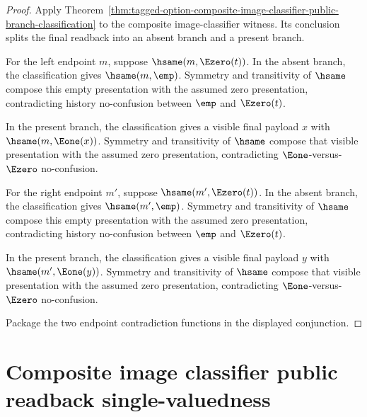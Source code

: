 \begin{proof}
Apply
Theorem~\ref{thm:tagged-option-composite-image-classifier-public-branch-classification}
to the composite image-classifier witness. Its conclusion splits the final
readback into an absent branch and a present branch.

For the left endpoint $m$, suppose $\hsame(m,\Ezero(t))$. In the absent branch,
the classification gives $\hsame(m,\emp)$. Symmetry and transitivity of
$\hsame$ compose this empty presentation with the assumed zero presentation,
contradicting history no-confusion between $\emp$ and $\Ezero(t)$.

In the present branch, the classification gives a visible final payload $x$
with $\hsame(m,\Eone(x))$. Symmetry and transitivity of $\hsame$ compose that
visible presentation with the assumed zero presentation, contradicting
$\Eone$-versus-$\Ezero$ no-confusion.

For the right endpoint $m'$, suppose $\hsame(m',\Ezero(t))$. In the absent
branch, the classification gives $\hsame(m',\emp)$. Symmetry and transitivity
of $\hsame$ compose this empty presentation with the assumed zero presentation,
contradicting history no-confusion between $\emp$ and $\Ezero(t)$.

In the present branch, the classification gives a visible final payload $y$
with $\hsame(m',\Eone(y))$. Symmetry and transitivity of $\hsame$ compose that
visible presentation with the assumed zero presentation, contradicting
$\Eone$-versus-$\Ezero$ no-confusion.

Package the two endpoint contradiction functions in the displayed conjunction.
\end{proof}
\section{Composite image classifier public readback single-valuedness}
\label{sec:option-composite-image-classifier-public-readback-single-valued}

